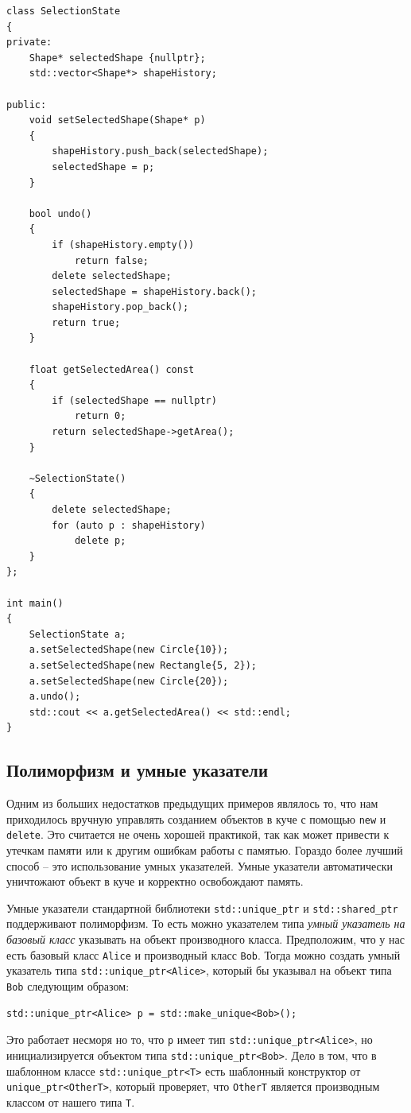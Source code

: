 \documentclass{article}
\begin{document}
\hfill
\begin{minipage}[t]{0.55\textwidth}
\begin{lstlisting}[style=csMiptCppBorderStyle]
class SelectionState
{
private:
	Shape* selectedShape {nullptr};
	std::vector<Shape*> shapeHistory;
	
public:
	void setSelectedShape(Shape* p)
	{
		shapeHistory.push_back(selectedShape);
		selectedShape = p;
	}
	
	bool undo()
	{
		if (shapeHistory.empty())
			return false;
		delete selectedShape;
		selectedShape = shapeHistory.back();
		shapeHistory.pop_back();
        return true;
	}
	
	float getSelectedArea() const
	{
		if (selectedShape == nullptr)
			return 0;
		return selectedShape->getArea();
	}
	
	~SelectionState()
	{
		delete selectedShape;
		for (auto p : shapeHistory)
			delete p;
	}
};

int main()
{
    SelectionState a;
    a.setSelectedShape(new Circle{10});
    a.setSelectedShape(new Rectangle{5, 2});
    a.setSelectedShape(new Circle{20});
    a.undo();
    std::cout << a.getSelectedArea() << std::endl;
}
\end{lstlisting}
\end{minipage}

\newpage
\subsection*{Полиморфизм и умные указатели}
Одним из больших недостатков предыдущих примеров являлось то, что нам приходилось вручную управлять созданием объектов в куче с помощью \texttt{new} и \texttt{delete}. Это считается не очень хорошей практикой, так как может привести к утечкам памяти или к другим ошибкам работы с памятью. Гораздо более лучший способ -- это использование умных указателей. Умные указатели автоматически уничтожают объект в куче и корректно освобождают память.

Умные указатели стандартной библиотеки \texttt{std::unique\_ptr} и \texttt{std::shared\_ptr} поддерживают полиморфизм. То есть можно указателем типа \textit{умный указатель на базовый класс} указывать на объект производного класса.
Предположим, что у нас есть базовый класс \texttt{Alice} и производный класс \texttt{Bob}. Тогда можно создать умный указатель типа \texttt{std::unique\_ptr<Alice>}, который бы указывал на объект типа \texttt{Bob} следующим образом:
\begin{lstlisting}[style=csMiptCppStyle]
std::unique_ptr<Alice> p = std::make_unique<Bob>();
\end{lstlisting}
Это работает несморя но то, что \texttt{p} имеет тип \texttt{std::unique\_ptr<Alice>}, но инициализируется объектом типа \texttt{std::unique\_ptr<Bob>}.
Дело в том, что в шаблонном классе \texttt{std::unique\_ptr<T>} есть шаблонный конструктор от \texttt{unique\_ptr<OtherT>}, который проверяет, что \texttt{OtherT} является производным классом от нашего типа \texttt{T}.
\end{document}
